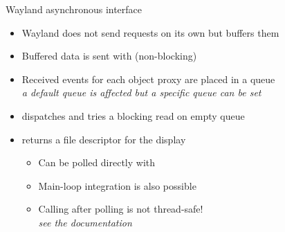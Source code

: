 \begin{frame}{Wayland asynchronous interface}
  \begin{itemize}
  \item Wayland does not send requests on its own but buffers them
  \item Buffered data is sent with  (non-blocking)
  \item Received events for each object proxy are placed in a queue\\
    \textit{a default queue is affected but a specific queue can be set}
  \item {} dispatches and tries a blocking read on empty queue
  \item {} returns a file descriptor for the display
    \begin{itemize}
    \item Can be polled directly with 
    \item Main-loop  integration is also possible
    \item Calling  after polling is not thread-safe!\\
      \textit{see the  documentation}
    \end{itemize}
  \end{itemize}
\end{frame}

